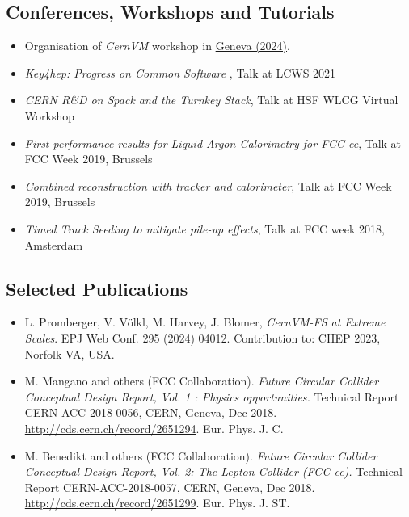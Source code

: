 \subsection*{Conferences, Workshops and Tutorials}

\begin{itemize}
\item[] Organisation of \emph{CernVM} workshop in
        \href{https://indico.cern.ch/e/cvm24}{Geneva (2024)}.


\item[] {\emph{ Key4hep: Progress on Common Software }, Talk at { LCWS 2021}}
\item[] {\emph{ CERN R\&D on Spack and the Turnkey Stack}, Talk at {HSF WLCG Virtual Workshop}}
\item[] {\emph{ First performance results for Liquid Argon Calorimetry for FCC-ee}, Talk at { FCC Week 2019, Brussels}}
\item[] {\emph{ Combined reconstruction with tracker and calorimeter}, Talk at { FCC Week 2019, Brussels}}
\item[] {\emph{ Timed Track Seeding to mitigate pile-up effects}, Talk at FCC week
2018, Amsterdam} 
\end{itemize}

\subsection*{Selected Publications}


\begin{itemize}

\item[] L. Promberger, V. V\"olkl, M. Harvey, J. Blomer, \emph{CernVM-FS at Extreme Scales}. EPJ Web Conf. 295 (2024) 04012. Contribution to: CHEP 2023, Norfolk VA, USA.

\item[] {M. Mangano and others (FCC Collaboration). \emph{Future Circular Collider Conceptual
Design Report, Vol. 1 : Physics opportunities. } Technical Report CERN-ACC-2018-0056, CERN, Geneva,
Dec 2018.  \url{http://cds.cern.ch/record/2651294}.  Eur. Phys. J. C.} \\

\item[] {M.  Benedikt  and  others  (FCC  Collaboration). \emph{Future  Circular  Collider
Conceptual  Design  Report,  Vol.  2:  The  Lepton  Collider  (FCC-ee).}   Technical Report
CERN-ACC-2018-0057, CERN, Geneva, Dec  2018.   \url{http://cds.cern.ch/record/2651299}. Eur. Phys. J. ST.} \\


\end{itemize}

